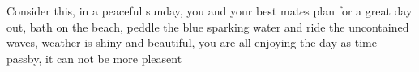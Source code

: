 Consider this, in a peaceful sunday, you and your best mates plan for a great day out, bath on the beach, peddle the blue sparking water and ride the uncontained waves, weather is shiny and beautiful, you are all enjoying the day as time passby, it can not be more pleasent 